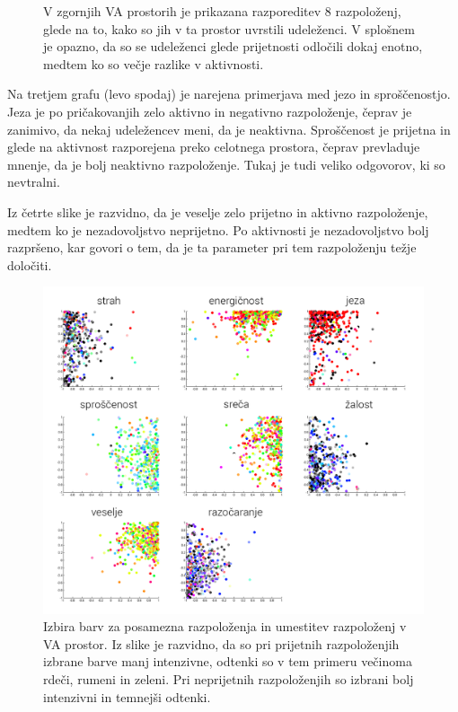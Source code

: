 \documentclass[a4paper, 12pt]{book}
\begin{document}
{\begin{figure}[!hbt]
\caption{V zgornjih VA prostorih je prikazana razporeditev 8 razpoloženj, glede na to, kako so jih v ta prostor uvrstili udeleženci. V splošnem je opazno, da so se udeleženci glede prijetnosti odločili dokaj enotno, medtem ko so večje razlike v aktivnosti.}
\label{moodperception}
\end{figure} 

Na tretjem grafu (levo spodaj) je narejena primerjava med jezo in sproščenostjo. Jeza je po pričakovanjih zelo aktivno in negativno razpoloženje, čeprav je zanimivo, da nekaj udeležencev meni, da je neaktivna. Sproščenost je prijetna in glede na aktivnost razporejena preko celotnega prostora, čeprav prevladuje mnenje, da je bolj neaktivno razpoloženje. Tukaj je tudi veliko odgovorov, ki so nevtralni.

Iz četrte slike je razvidno, da je veselje zelo prijetno in aktivno razpoloženje, medtem ko je nezadovoljstvo neprijetno. Po aktivnosti je nezadovoljstvo bolj razpršeno, kar govori o tem, da je ta parameter pri tem razpoloženju težje določiti.

\begin{figure}[!hbt]
\centering
\includegraphics[width=14cm]{images/mood_color.png}

\caption{Izbira barv za posamezna razpoloženja in umestitev razpoloženj v VA prostor. Iz slike je razvidno, da so pri prijetnih razpoloženjih izbrane barve manj intenzivne, odtenki so v tem primeru večinoma rdeči, rumeni in zeleni. Pri neprijetnih razpoloženjih so izbrani bolj intenzivni in temnejši odtenki.}
\label{moodcolor}
\end{figure} 

}
\end{document}
